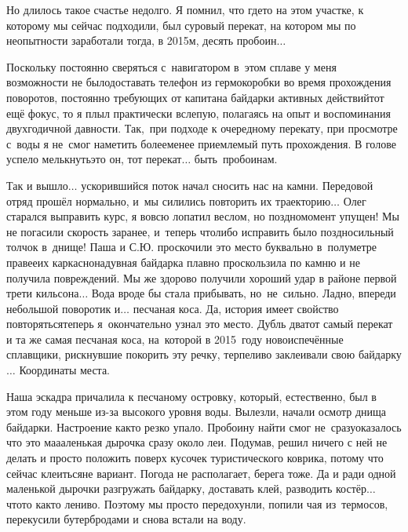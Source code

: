 Но длилось такое счастье недолго. Я помнил, что где\sdash то на этом участке, к которому мы сейчас подходили, был суровый перекат, на котором мы по неопытности заработали тогда, в 2015\sdash м, десять пробоин$\ldots$

Поскольку постоянно сверяться с~навигатором в~этом сплаве у меня возможности не было\mdash доставать телефон из гермокоробки во время прохождения поворотов, постоянно требующих от капитана байдарки активных действий\mdash тот ещё фокус, то я плыл практически вслепую, полагаясь на опыт и воспоминания двухгодичной давности. Так,~при подходе к очередному перекату, при просмотре с~воды я не~смог наметить более\sdash менее приемлемый путь прохождения. В голове успело мелькнуть\mdash это он, тот перекат$\ldots$ быть~пробоинам.

Так и вышло$\ldots$ ускорившийся поток начал сносить нас на камни. Передовой отряд прошёл нормально, и~мы силились повторить их траекторию$\ldots$ Олег старался выправить курс, я вовсю лопатил веслом, но поздно\mdash момент упущен! Мы не погасили скорость заранее, и~теперь что\sdash либо исправить было поздно\mdash сильный толчок в~днище! Паша и С.Ю. проскочили это место буквально в~полуметре правее\mdash их каркасно\sdash надувная байдарка плавно проскользила по камню и не получила повреждений. Мы же здорово получили хороший удар в районе первой трети кильсона$\ldots$ Вода вроде бы стала прибывать, но~не~сильно. Ладно, впереди небольшой поворотик и$\ldots$ песчаная коса. Да, история имеет свойство повторяться\mdash теперь я~окончательно узнал это место. Дубль два\mdash тот самый перекат и та же самая песчаная коса, на~которой в 2015~году новоиспечённые сплавщики, рискнувшие покорить эту речку, терпеливо заклеивали свою байдарку$\ldots$ Координаты места\mdash \CoordsLidOstrovok.

Наша эскадра причалила к песчаному островку, который, естественно, был в этом году меньше из-за высокого уровня воды. Вылезли, начали осмотр днища байдарки. Настроение как\sdash то резко упало. Пробоину найти смог не~сразу\mdash оказалось что это ма\sdash а\sdash аленькая дырочка сразу около леи. Подумав, решил ничего с ней не делать и просто положить поверх кусочек туристического коврика, потому что сейчас клеиться\mdash не вариант. Погода не располагает, берега тоже. Да и ради одной маленькой дырочки разгружать байдарку, доставать клей, разводить костёр$\ldots$ что\sdash то как\sdash то лениво. Поэтому мы просто передохунли, попили чая из~термосов, перекусили бутербродами и снова встали на воду.


